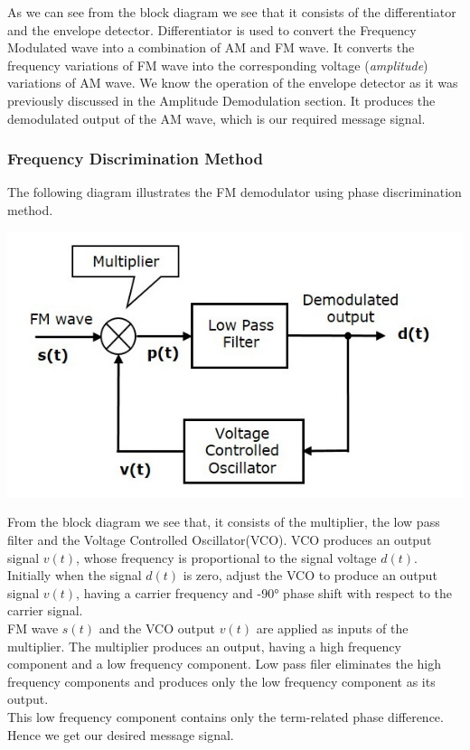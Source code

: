 \documentclass[12pt,a4paper]{article}%
\begin{document}
\begin{flushleft}
\begin{flushleft}
\begin{flushleft}
\begin{flushleft}
\begin{flushleft}
\begin{center}
						\end{center}
						As we can see from the block diagram we see that it consists of the differentiator and the envelope detector. Differentiator is used to convert the Frequency Modulated wave into a combination of AM and FM wave. It converts the frequency variations of FM wave into the corresponding voltage (\textit{amplitude}) variations of AM wave. We know the operation of the envelope detector as it was previously discussed in the Amplitude Demodulation section. It produces the demodulated output of the AM wave, which is our required message signal.
					\end{flushleft}
					\subsubsection{Frequency Discrimination Method}
					\begin{flushleft}
						The following diagram illustrates the FM demodulator using phase discrimination method.
						\begin{center}
							\includegraphics[width=0.60 \textwidth]{./images/Phase discrimination method.png}
						\end{center}
						From the block diagram we see that, it consists of the multiplier, the low pass filter and the Voltage Controlled Oscillator(VCO). VCO produces an output signal $v(t)$, whose frequency is proportional to the signal voltage $d(t)$. \\\smallskip
						Initially when the signal $d(t)$ is zero, adjust the VCO to produce an output signal $v(t)$, having a carrier frequency and -\ang{90} phase shift with respect to the carrier signal.\\\smallskip
						FM wave $s(t)$ and the VCO output $v(t)$ are applied as inputs of the multiplier. The multiplier produces an output, having a high frequency component and a low frequency component. Low pass filer eliminates the high frequency components and produces only the low frequency component as its output.\\\smallskip
						This low frequency component contains only the term-related phase difference. Hence we get our desired message signal.
					\end{flushleft}
				\end{flushleft}
			\end{flushleft} 
		\end{flushleft}
	\end{flushleft}
	\pagebreak
\end{document}
